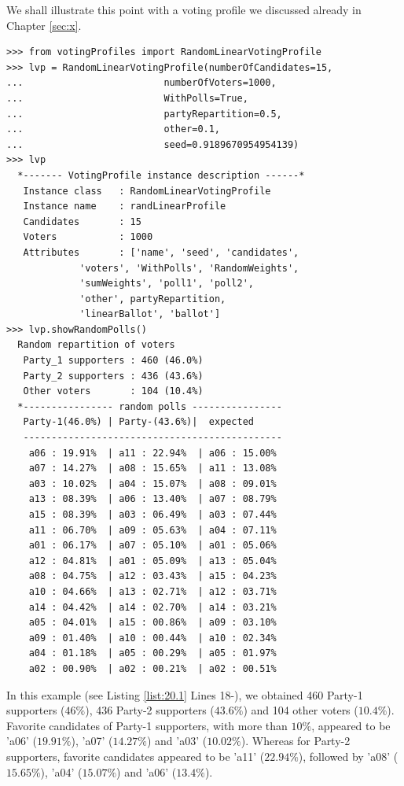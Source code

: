 We shall illustrate this point with a voting profile we discussed already in Chapter \ref{sec:x}.
\begin{lstlisting}[caption={Example of a 3 parties voting profile},label=list:20.1]
>>> from votingProfiles import RandomLinearVotingProfile
>>> lvp = RandomLinearVotingProfile(numberOfCandidates=15,
...                         numberOfVoters=1000,
...                         WithPolls=True,
...                         partyRepartition=0.5,
...                         other=0.1,
...                         seed=0.9189670954954139)
>>> lvp
  *------- VotingProfile instance description ------*
   Instance class   : RandomLinearVotingProfile
   Instance name    : randLinearProfile
   Candidates       : 15
   Voters           : 1000
   Attributes       : ['name', 'seed', 'candidates',
             'voters', 'WithPolls', 'RandomWeights',
             'sumWeights', 'poll1', 'poll2',
             'other', partyRepartition,
             'linearBallot', 'ballot']
>>> lvp.showRandomPolls()
  Random repartition of voters
   Party_1 supporters : 460 (46.0%)
   Party_2 supporters : 436 (43.6%)
   Other voters       : 104 (10.4%)
  *---------------- random polls ----------------
   Party-1(46.0%) | Party-(43.6%)|  expected  
   ----------------------------------------------
    a06 : 19.91%  | a11 : 22.94%  | a06 : 15.00%
    a07 : 14.27%  | a08 : 15.65%  | a11 : 13.08%
    a03 : 10.02%  | a04 : 15.07%  | a08 : 09.01%
    a13 : 08.39%  | a06 : 13.40%  | a07 : 08.79%
    a15 : 08.39%  | a03 : 06.49%  | a03 : 07.44%
    a11 : 06.70%  | a09 : 05.63%  | a04 : 07.11%
    a01 : 06.17%  | a07 : 05.10%  | a01 : 05.06%
    a12 : 04.81%  | a01 : 05.09%  | a13 : 05.04%
    a08 : 04.75%  | a12 : 03.43%  | a15 : 04.23%
    a10 : 04.66%  | a13 : 02.71%  | a12 : 03.71%
    a14 : 04.42%  | a14 : 02.70%  | a14 : 03.21%
    a05 : 04.01%  | a15 : 00.86%  | a09 : 03.10%
    a09 : 01.40%  | a10 : 00.44%  | a10 : 02.34%
    a04 : 01.18%  | a05 : 00.29%  | a05 : 01.97%
    a02 : 00.90%  | a02 : 00.21%  | a02 : 00.51%
\end{lstlisting}
In this example (see Listing \ref{list:20.1} Lines 18-), we obtained 460 Party-1 supporters ($46\%$), 436 Party-2 supporters ($43.6\%$) and 104 other voters ($10.4\%$). Favorite candidates of Party-1 supporters, with more than $10\%$, appeared to be 'a06' ($19.91\%$), 'a07' ($14.27\%$) and 'a03' ($10.02\%$). Whereas for Party-2 supporters, favorite candidates appeared to be 'a11' ($22.94\%$), followed by 'a08' ($15.65\%$), 'a04' ($15.07\%$) and 'a06' ($13.4\%$).

